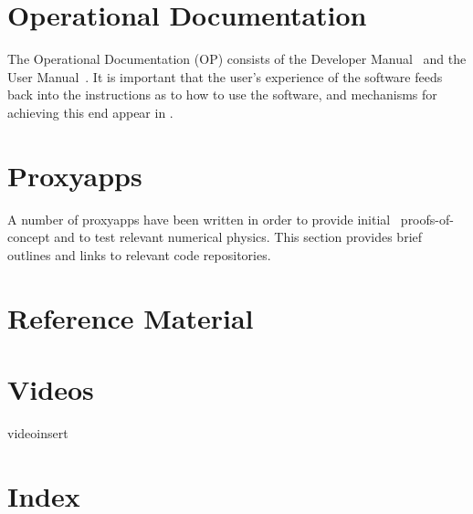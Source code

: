 \chapter{Operational Documentation}\label{sec:OP}
The Operational Documentation (OP) consists of the Developer Manual~ and
the User Manual~. It is important that
the user's experience of the software feeds back into the instructions
as to how to use the software, and mechanisms for achieving this end appear
in .

% 
% 
% 
% 

\chapter{Proxyapps}\label{sec:proxyapps}
A number of proxyapps have been written in order to provide initial \nep \ proofs-of-concept and to test relevant 
numerical physics.  This section provides brief outlines and links to relevant code repositories.


\chapter{Reference Material}\label{sec:REF}

\chapter{Videos}\label{sec:videos}
videoinsert

\chapter{Index}\label{sec:IND}

